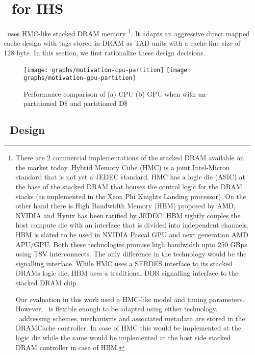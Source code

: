 \section{\cachename\ for IHS} \label{design+mechanism}
\cachename\ uses HMC-like \cite{hmc} stacked DRAM memory
\footnote{
There are 2 commercial implementations of the stacked DRAM available on the market today. 
Hybrid Memory Cube (HMC) is a joint Intel-Micron standard that is not yet a JEDEC standard. 
HMC has a logic die (ASIC) at the base of the stacked DRAM that houses the control logic for the DRAM stacks (as implemented in the Xeon Phi Knights Landing processor\cite{xeonphi}). 
On the other hand there is High Bandwidth Memory (HBM) proposed by AMD, NVIDIA and Hynix has been ratified by JEDEC. 
HBM tightly couples the host compute die with an interface that is divided into independent channels.
HBM is slated to be used in NVIDIA Pascal GPU and next generation AMD APU/GPU.
Both these technologies promise high bandwidth upto 250 GBps using TSV interconnects. The only difference in the technology would be the signalling interface. While HMC uses a SERDES interface to its stacked DRAMs logic die, HBM uses a traditional DDR signalling interface to the stacked DRAM chip.
\par Our evaluation in this work used a HMC-like model and timing parameters. However, \cachename\ is flexible enough to be adapted using either technology. \cachename\ addressing schemes, mechanisms and associated metadata are stored in the DRAMCache controller. In case of HMC this would be implemented at the logic die while the same would be implemented at the host side stacked DRAM controller in case of HBM.
}. It adapts an aggressive direct mapped cache design with tags stored in DRAM as TAD units \cite{alloy} with a cache line size of 128 byte. In this section, we first rationalize these design decisions.
\begin{figure}[htb]
	\centering
	\texttt{[image: graphs/motivation-cpu-partition]}
	\texttt{[image: graphs/motivation-gpu-partition]}
	\caption{Performance comparison of (a) CPU (b) GPU when with un-partitioned D\$ and partitioned D\$}
	\label{fig:motivation-partition}
\end{figure}
\subsection{\cachename\ Design} \label{design}

